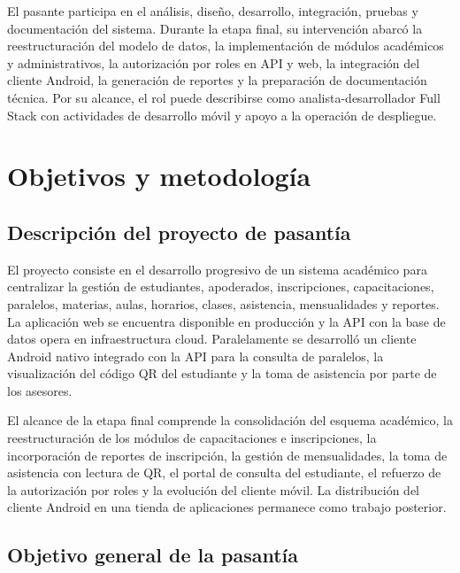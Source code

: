 \documentclass[12pt,a4paper,oneside]{report}
\begin{document}
El pasante participa en el análisis, diseño, desarrollo, integración, pruebas y documentación del sistema. Durante la etapa final, su intervención abarcó la reestructuración del modelo de datos, la implementación de módulos académicos y administrativos, la autorización por roles en API y web, la integración del cliente Android, la generación de reportes y la preparación de documentación técnica. Por su alcance, el rol puede describirse como analista-desarrollador Full Stack con actividades de desarrollo móvil y apoyo a la operación de despliegue.

\chapter{Objetivos y metodología}

\section{Descripción del proyecto de pasantía}

El proyecto consiste en el desarrollo progresivo de un sistema académico para centralizar la gestión de estudiantes, apoderados, inscripciones, capacitaciones, paralelos, materias, aulas, horarios, clases, asistencia, mensualidades y reportes. La aplicación web se encuentra disponible en producción y la API con la base de datos opera en infraestructura cloud. Paralelamente se desarrolló un cliente Android nativo integrado con la API para la consulta de paralelos, la visualización del código QR del estudiante y la toma de asistencia por parte de los asesores.

El alcance de la etapa final comprende la consolidación del esquema académico, la reestructuración de los módulos de capacitaciones e inscripciones, la incorporación de reportes de inscripción, la gestión de mensualidades, la toma de asistencia con lectura de QR, el portal de consulta del estudiante, el refuerzo de la autorización por roles y la evolución del cliente móvil. La distribución del cliente Android en una tienda de aplicaciones permanece como trabajo posterior.

\section{Objetivo general de la pasantía}
\end{document}
